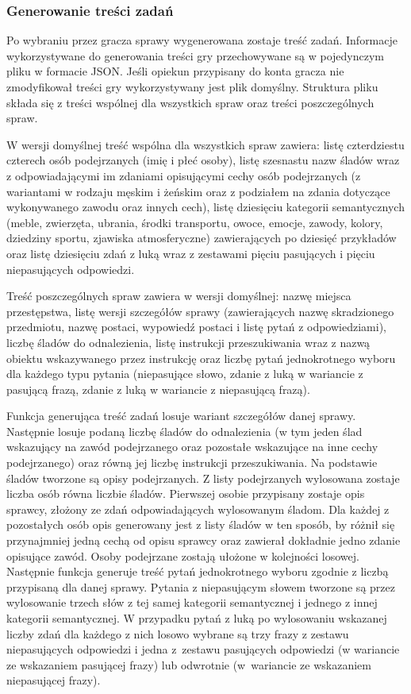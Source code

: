         \subsubsection{Generowanie treści zadań}
        Po wybraniu przez gracza sprawy wygenerowana zostaje treść zadań.
        Informacje wykorzystywane do generowania treści gry przechowywane są w pojedynczym pliku w formacie JSON.
        Jeśli opiekun przypisany do konta gracza nie zmodyfikował treści gry wykorzystywany jest plik domyślny.
        Struktura pliku składa się z treści wspólnej dla wszystkich spraw oraz treści poszczególnych spraw.
        
        W wersji domyślnej treść wspólna dla wszystkich spraw zawiera: listę czterdziestu czterech osób podejrzanych (imię i płeć osoby), listę szesnastu nazw śladów wraz z odpowiadającymi im zdaniami opisującymi cechy osób podejrzanych (z wariantami w rodzaju męskim i żeńskim oraz z podziałem na zdania dotyczące wykonywanego zawodu oraz innych cech), listę dziesięciu kategorii semantycznych (meble, zwierzęta, ubrania, środki transportu, owoce, emocje, zawody, kolory, dziedziny sportu, zjawiska atmosferyczne) zawierających po dziesięć przykładów oraz listę dziesięciu zdań z luką wraz z zestawami pięciu pasujących i pięciu niepasujących odpowiedzi.
        
        Treść poszczególnych spraw zawiera w wersji domyślnej: nazwę miejsca przestępstwa, listę wersji szczegółów sprawy (zawierających nazwę skradzionego przedmiotu, nazwę postaci, wypowiedź postaci i listę pytań z odpowiedziami), liczbę śladów do odnalezienia, listę instrukcji przeszukiwania wraz z nazwą obiektu wskazywanego przez instrukcję oraz liczbę pytań jednokrotnego wyboru dla każdego typu pytania (niepasujące słowo, zdanie z luką w wariancie z pasującą frazą, zdanie z luką w wariancie z niepasującą frazą).
        
        Funkcja generująca treść zadań losuje wariant szczegółów danej sprawy.
        Następnie losuje podaną liczbę śladów do odnalezienia (w tym jeden ślad wskazujący na zawód podejrzanego oraz pozostałe wskazujące na inne cechy podejrzanego) oraz równą jej liczbę instrukcji przeszukiwania.
        Na podstawie śladów tworzone są opisy podejrzanych.
        Z listy podejrzanych wylosowana zostaje liczba osób równa liczbie śladów.
        Pierwszej osobie przypisany zostaje opis sprawcy, złożony ze zdań odpowiadających wylosowanym śladom.
        Dla każdej z pozostałych osób opis generowany jest z listy śladów w ten sposób, by różnił się przynajmniej jedną cechą od opisu sprawcy oraz zawierał dokładnie jedno zdanie opisujące zawód.
        Osoby podejrzane zostają ułożone w kolejności losowej.
        Następnie funkcja generuje treść pytań jednokrotnego wyboru zgodnie z liczbą przypisaną dla danej sprawy.
        Pytania z niepasującym słowem tworzone są przez wylosowanie trzech słów z tej samej kategorii semantycznej i jednego z innej kategorii semantycznej.
        W przypadku pytań z luką po wylosowaniu wskazanej liczby zdań dla każdego z nich losowo wybrane są trzy frazy z zestawu niepasujących odpowiedzi i jedna z~zestawu pasujących odpowiedzi (w wariancie ze wskazaniem pasującej frazy) lub odwrotnie (w~wariancie ze wskazaniem niepasującej frazy).
        
